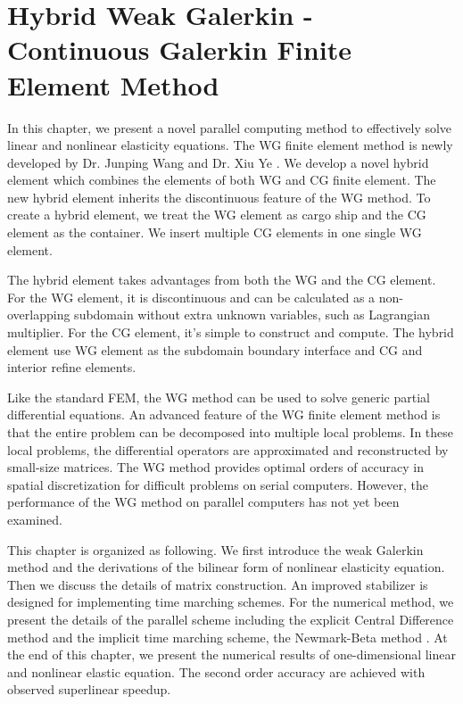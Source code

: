 \chapter{Hybrid Weak Galerkin - Continuous Galerkin Finite Element Method}
\label{chapter3}

In this chapter, we present a novel parallel computing method to effectively solve linear and nonlinear elasticity equations. The WG finite element method is newly developed by Dr. Junping Wang and Dr. Xiu Ye  \cite{wang2013weak}. We develop a novel hybrid element which combines the elements of both WG and CG finite element. The new hybrid element inherits the discontinuous feature of the WG method. To create a hybrid element, we treat the WG element as cargo ship and the CG element as the container. We insert multiple CG elements in one single WG element. 

The hybrid element takes advantages from both the WG and the CG element. For the WG element, it is discontinuous and can be calculated as a non-overlapping subdomain without extra unknown variables, such as Lagrangian multiplier. For the CG element, it's simple to construct and compute. The hybrid element use WG element as the subdomain boundary interface and CG and interior refine elements.

Like the standard FEM, the WG method can be used to solve generic partial differential equations. An advanced feature of the WG finite element method is that the entire problem can be decomposed into multiple local problems. In these local problems, the differential operators are approximated and reconstructed by small-size matrices. The WG method provides optimal orders of accuracy in spatial discretization for difficult problems on serial computers. However, the performance of the WG method on parallel computers has not yet been examined.

This chapter is organized as following. We first introduce the weak Galerkin method and the derivations of the bilinear form of nonlinear elasticity equation. Then we discuss the details of matrix construction. An improved stabilizer is designed for implementing time marching schemes. For the numerical method, we present the details of the parallel scheme including the explicit Central Difference method and the implicit time marching scheme, the Newmark-Beta method \cite{adeli1978algorithms}. At the end of this chapter, we present the numerical results of one-dimensional linear and nonlinear elastic equation. The second order accuracy are achieved with observed superlinear speedup.

